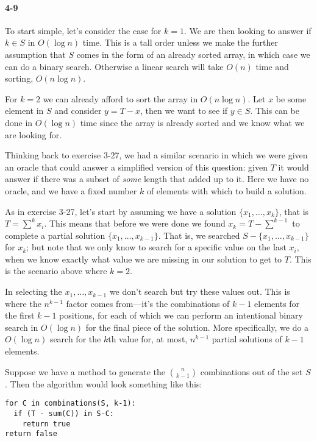 \documentclass{report}
\begin{document}
\paragraph{4-9} To start simple, let's consider the case for $k=1$. We are then looking to answer if $k\in S$ in $O(\log n)$ time. This is a tall order unless we make the further assumption that $S$ comes in the form of an already sorted array, in which case we can do a binary search. Otherwise a linear search will take $O(n)$ time and sorting, $O(n\log n)$.

For $k=2$ we can already afford to sort the array in $O(n\log n)$. Let $x$ be some element in $S$ and consider $y=T-x$, then we want to see if $y\in S$. This can be done in $O(\log n)$ time since the array is already sorted and we know what we are looking for.

Thinking back to exercise 3-27, we had a similar scenario in which we were given an oracle that could answer a simplified version of this question: given $T$ it would answer if there was a subset of \emph{some} length that added up to it. Here we have no oracle, and we have a fixed number $k$ of elements with which to build a solution.

As in exercise 3-27, let's start by assuming we have a solution $\{ x_1,\ldots,x_k \}$, that is $T = \sum^k x_i$. This means that before we were done we found $x_k = T - \sum^{k-1}$ to complete a partial solution $\{ x_1,\ldots,x_{k-1}\}$. That is, we searched $S - \{x_1,\ldots,x_{k-1}\}$ for $x_k$; but note that we only know to search for a specific value on the last $x_i$, when we know exactly what value we are missing in our solution to get to $T$. This is the scenario above where $k=2$.

In selecting the $x_1,\ldots,x_{k-1}$ we don't search but try these values out. This is where the $n^{k-1}$ factor comes from---it's the combinations of $k-1$ elements for the first $k-1$ positions, for each of which we can perform an intentional binary search in $O(\log n)$ for the final piece of the solution. More specifically, we do a $O(\log n)$ search for the $k$th value for, at most, $n^{k-1}$ partial solutions of $k-1$ elements.

Suppose we have a method to generate the $\binom{n}{k-1}$ combinations out of the set $S$. Then the algorithm would look something like this:
\begin{lstlisting}
for C in combinations(S, k-1):
  if (T - sum(C)) in S-C:
    return true
return false
\end{lstlisting}
\end{document}
